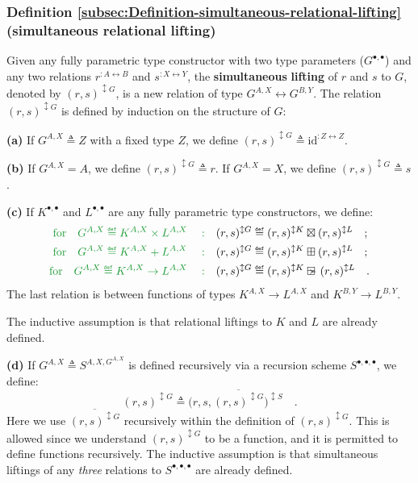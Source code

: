 \subsubsection{Definition \label{subsec:Definition-simultaneous-relational-lifting}\ref{subsec:Definition-simultaneous-relational-lifting}
(simultaneous relational lifting)}

Given any fully parametric type constructor with two type parameters
($G^{\bullet,\bullet}$) and any two relations $r^{:A\leftrightarrow B}$
and $s^{:X\leftrightarrow Y}$, the \textbf{simultaneous} \textbf{lifting}
of $r$ and $s$ to $G$, denoted by $(r,s)^{\updownarrow G}$, is
a new relation of type $G^{A,X}\leftrightarrow G^{B,Y}$. The relation
$(r,s)^{\updownarrow G}$ is defined by induction on the structure
of $G$:

\textbf{(a)} If $G^{A,X}\triangleq Z$ with a fixed type $Z$, we
define $(r,s)^{\updownarrow G}\triangleq\text{id}^{:Z\leftrightarrow Z}$.

\textbf{(b)} If $G^{A,X}=A$, we define $(r,s)^{\updownarrow G}\triangleq r$.
If $G^{A,X}=X$, we define $(r,s)^{\updownarrow G}\triangleq s$.

\textbf{(c)} If $K^{\bullet,\bullet}$ and $L^{\bullet,\bullet}$
are any fully parametric type constructors, we define: 
\begin{align*}
{\color{greenunder}\text{for}\quad G^{A,X}\triangleq K^{A,X}\times L^{A,X}\quad:}\quad & (r,s)^{\updownarrow G}\triangleq(r,s)^{\updownarrow K}\boxtimes(r,s)^{\updownarrow L}\quad;\\
{\color{greenunder}\text{for}\quad G^{A,X}\triangleq K^{A,X}+L^{A,X}\quad:}\quad & (r,s)^{\updownarrow G}\triangleq(r,s)^{\updownarrow K}\boxplus(r,s)^{\updownarrow L}\quad;\\
{\color{greenunder}\text{for}\quad G^{A,X}\triangleq K^{A,X}\rightarrow L^{A,X}\quad:}\quad & (r,s)^{\updownarrow G}\triangleq(r,s)^{\updownarrow K}\ogreaterthan(r,s)^{\updownarrow L}\quad.
\end{align*}
The last relation is between functions of types $K^{A,X}\rightarrow L^{A,X}$
and $K^{B,Y}\rightarrow L^{B,Y}$. 

The inductive assumption is that relational liftings to $K$ and $L$
are already defined.

\textbf{(d)} If $G^{A,X}\triangleq S^{A,X,G^{A,X}}$ is defined recursively
via a recursion scheme $S^{\bullet,\bullet,\bullet}$, we define:
\[
(r,s)^{\updownarrow G}\triangleq\big(r,s,\overline{(r,s)^{\updownarrow G}}\big)^{\updownarrow S}\quad.
\]
Here we use $\overline{(r,s)^{\updownarrow G}}$ recursively within
the definition of $(r,s)^{\updownarrow G}$. This is allowed since
we understand $(r,s)^{\updownarrow G}$ to be a function, and it is
permitted to define functions recursively. The inductive assumption
is that simultaneous liftings of any \emph{three} relations to $S^{\bullet,\bullet,\bullet}$
are already defined. 

